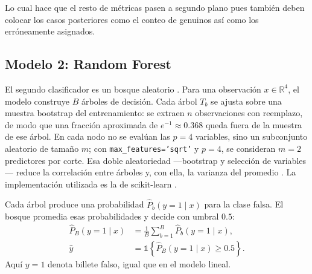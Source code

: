\documentclass[conference]{IEEEtran}
\begin{document}
	Lo cual hace que el resto de métricas pasen a segundo plano pues también deben colocar los casos posteriores como el conteo de genuinos así como los erróneamente asignados.
	
    \subsection{Modelo 2: Random Forest}
    \label{sec:rf}
    
    El segundo clasificador es un bosque aleatorio \cite{breiman2001random}. Para una observación $x\in\mathbb{R}^4$, el modelo construye $B$ árboles de decisión. Cada árbol $T_b$ se ajusta sobre una muestra bootstrap del entrenamiento: se extraen $n$ observaciones con reemplazo, de modo que una fracción aproximada de $e^{-1}\approx 0.368$ queda fuera de la muestra de ese árbol. En cada nodo no se evalúan las $p=4$ variables, sino un subconjunto aleatorio de tamaño $m$; con \texttt{max\_features='sqrt'} y $p=4$, se consideran $m=2$ predictores por corte. Esa doble aleatoriedad —bootstrap y selección de variables— reduce la correlación entre árboles y, con ella, la varianza del promedio \cite{hastie2009elements}. La implementación utilizada es la de scikit-learn \cite{pedregosa2011scikit}.
    
   Cada árbol produce una probabilidad $\hat{P}_b(y=1\mid x)$ para la clase falsa. El bosque promedia esas probabilidades y decide con umbral $0.5$:
    \begin{align}
    	\hat{P}_B(y=1\mid x) &= \frac{1}{B}\sum_{b=1}^{B}\hat{P}_b(y=1\mid x), \nonumber \\
    	\hat{y} &= \mathbb{1}\left\{\hat{P}_B(y=1\mid x)\ge 0.5\right\}.
    	\label{eq:rf-prob}
    \end{align}
    Aquí $y=1$ denota billete falso, igual que en el modelo lineal.
    
\end{document}
